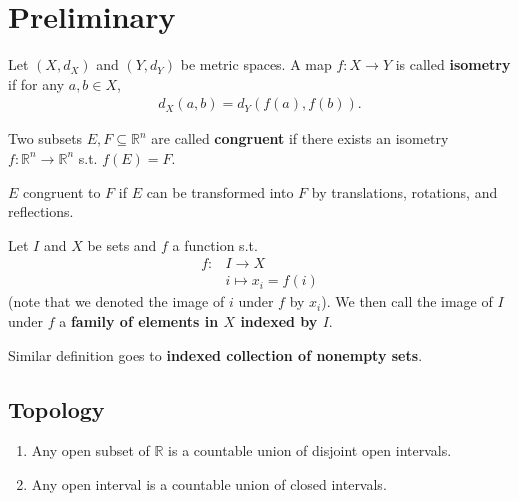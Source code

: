 \chapter{Preliminary}

\begin{definition}[Isometry]
\normalfont Let $(X,d_X)$ and $(Y, d_Y)$ be metric spaces. A map $f: X \to Y$ is called \textbf{isometry} if for any $a,b \in X$,
\begin{align*}
    d_X(a,b) = d_Y(f(a), f(b)).
\end{align*}
\end{definition}

\begin{definition}[Congruent]
 \normalfont Two subsets $E,F \subseteq \mathbb{R}^{n}$ are called \textbf{congruent} if there exists an isometry $f: \mathbb{R}^{n} \to \mathbb{R}^{n}$ s.t. $f(E) = F$.
\end{definition}

\begin{defintuition}
    $E$ congruent to $F$ if $E$ can be transformed into $F$ by translations, rotations, and reflections.
\end{defintuition}

\begin{definition}
    \normalfont Let $I$ and $X$ be sets and $f$ a function s.t.
    \begin{align*}
       f : & I \to X
       \\ & i \mapsto x_i = f(i)
    \end{align*}
   (note that we denoted the image of $i$ under $f$ by $x_i$). We then call the image of $I$ under $f$ a \textbf{family of elements in $X$ indexed by $I$}. 
\end{definition}

\begin{remark}
    Similar definition goes to \textbf{indexed collection of nonempty sets}.
\end{remark}

\section{Topology}
\begin{proposition} \label{prop:1.1}
 \normalfont
 \begin{enumerate}
    \item Any open subset of $\mathbb{R}$ is a countable union of disjoint open intervals.
    \item Any open interval is a countable union of closed intervals.
 \end{enumerate}
\end{proposition}

